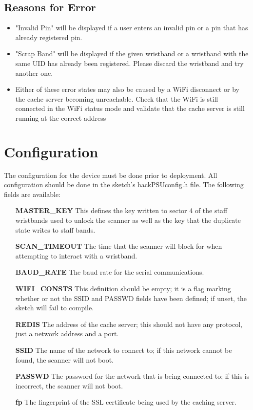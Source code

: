 \documentclass{article}
\begin{document}
\subsection{Reasons for Error}
\begin{itemize}
	\item "Invalid Pin" will be displayed if a user enters an invalid pin or a pin that has already registered pin.
	\item "Scrap Band" will be displayed if the given wristband or a wristband with the same UID has already been registered.  Please discard the wristband and try another one.
	\item Either of these error states may also be caused by a WiFi disconnect or by the cache server becoming unreachable.  Check that the WiFi is still connected in the WiFi status mode and validate that the cache server is still running at the correct address
\end{itemize}

\section{Configuration}
The configuration for the device must be done prior to deployment.  All configuration should be done in the sketch's hackPSUconfig.h file.  The following fields are available:
\begin{itemize}
	\item[\textbf{MASTER\_KEY}] This defines the key written to sector 4 of the staff wristbands used to unlock the scanner as well as the key that the duplicate state writes to staff bands.
	\item[\textbf{SCAN\_TIMEOUT}] The time that the scanner will block for when attempting to interact with a wristband.  
	\item[\textbf{BAUD\_RATE}] The baud rate for the serial communications.  
	\item[\textbf{WIFI\_CONSTS}] This definition should be empty; it is a flag marking whether or not the SSID and PASSWD fields have been defined; if unset, the sketch will fail to compile. 
	\item[\textbf{REDIS}] The address of the cache server; this should not have any protocol, just a network address and a port.
	\item[\textbf{SSID}] The name of the network to connect to; if this network cannot be found, the scanner will not boot.
	\item[\textbf{PASSWD}] The password for the network that is being connected to; if this is incorrect, the scanner will not boot.
	\item[\textbf{fp}] The fingerprint of the SSL certificate being used by the caching server.
\end{itemize}
\end{document}
